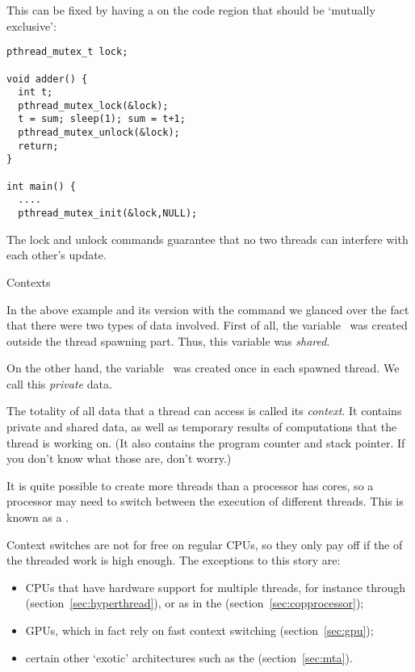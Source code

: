This can be fixed by having a  on the code region that should be
`mutually exclusive':
\begin{verbatim}
pthread_mutex_t lock;

void adder() {
  int t;
  pthread_mutex_lock(&lock);
  t = sum; sleep(1); sum = t+1; 
  pthread_mutex_unlock(&lock);
  return;
}

int main() {
  ....
  pthread_mutex_init(&lock,NULL);

\end{verbatim}
The lock and unlock commands guarantee that no two threads can
interfere with each other's update.


 {Contexts}
\label{sec:context}

In the above example and its version with the  command
we glanced over the fact that there were two types of data involved.
First of all, the variable~ was created outside the thread spawning
part. Thus, this variable was \emph{shared}.

On the other hand, the variable~ was created once in each spawned thread.
We call this \emph{private} data.

The totality of all data that a thread can access is called
its \emph{context}.  It contains private and shared data, as well as
temporary results of computations that the thread is working
on.
(It also contains the program counter and stack pointer. If
    you don't know what those are, don't worry.)

It is quite possible to create more threads than a processor has cores,
so a processor may need to switch between the execution of different threads.
This is known as a .

Context switches are not for free on regular CPUs, so they only pay off
if the  of the threaded work is high enough.
The exceptions to this story are:
\begin{itemize}
\item CPUs that have hardware support for multiple threads, for
  instance through 
  (section~\ref{sec:hyperthread}), or as in the
   (section~\ref{sec:copprocessor});
\item \acp{GPU}, which in fact rely on fast context switching (section~\ref{sec:gpu});
\item certain other `exotic' architectures such as the 
  (section~\ref{sec:mta}).
\end{itemize}

